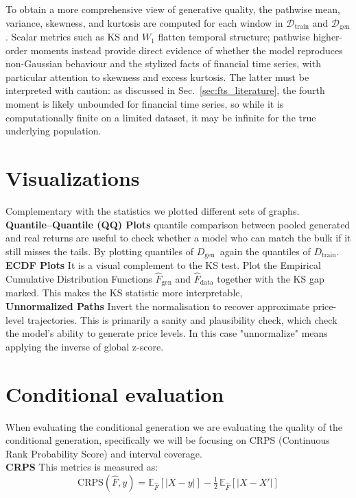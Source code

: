 To obtain a more comprehensive view of generative quality, the pathwise mean, variance,
skewness, and kurtosis are computed for each window in \(\mathcal{D}_{\text{train}}\) and
\(\mathcal{D}_{\text{gen}}\). Scalar metrics such as KS and \(W_1\) flatten temporal
structure; pathwise higher-order moments instead provide direct evidence of whether the
model reproduces non-Gaussian behaviour and the stylized facts of financial time series,
with particular attention to skewness and excess kurtosis. The latter must be interpreted
with caution: as discussed in Sec.~\ref{sec:fts_literature}, the fourth moment is likely
unbounded for financial time series, so while it is computationally finite on a limited
dataset, it may be infinite for the true underlying population.

\section{Visualizations}
Complementary with the statistics we plotted different sets of graphs.\\

\textbf{Quantile--Quantile (QQ) Plots} quantile comparison between pooled generated and real returns are useful to check whether a model who can match the bulk if it still misses the tails. By plotting quantiles of \(D_{\text{gen}}\)\ again the quantiles of \(D_{\text{train}}\).\\
\textbf{ECDF Plots} It is a visual complement to the KS test. Plot the Empirical Cumulative Distribution Functions \(\hat{F}_{\text{gen}}\) and \(\hat{F}_{\text{data}}\) together with the KS gap marked. This makes the KS statistic more interpretable,\\
\textbf{Unnormalized Paths} Invert the normalisation to recover approximate price-level trajectories. This is primarily a sanity and plausibility check, which check the model's ability to generate price levels. In this case "unnormalize" means applying the inverse of global z-score.

\section{Conditional evaluation}
When evaluating the conditional generation we are evaluating the quality of the conditional generation, specifically we will be focusing on CRPS (Continuous Rank Probability Score) and interval coverage.\\

\textbf{CRPS} This metrics is measured as:
\[
\text{CRPS}(\hat{F}, y) = \mathbb{E}_{\hat{F}} \left[|X - y|\right] - \tfrac{1}{2}\,\mathbb{E}_{\hat{F}}\left[|X - X'|\right]
\]

